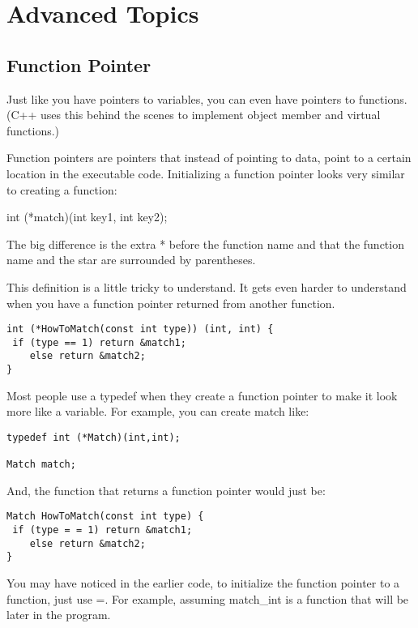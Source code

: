
\chapter{Advanced Topics}

\section{Function Pointer}
Just like you have pointers to variables, you can even have pointers to functions. (C++ uses this behind the scenes to implement object member and virtual functions.)

Function pointers are pointers that instead of pointing to data, point to a certain location in the executable code. Initializing a function pointer looks very similar to creating a function:

int (*match)(int key1, int key2);

The big difference is the extra * before the function name and that the function name and the star are surrounded by parentheses. 

This definition is a little tricky to understand. It gets even harder to understand when you have a function pointer returned from another function.
\begin{verbatim}
int (*HowToMatch(const int type)) (int, int) { 
 if (type == 1) return &match1; 
    else return &match2; 
} 
\end{verbatim}

Most people use a typedef when they create a function pointer to make it look more like a variable. For example, you can create match like:

\begin{verbatim}
typedef int (*Match)(int,int);

Match match;    
\end{verbatim}

 And, the function that returns a function pointer would just be:
 \begin{verbatim}
Match HowToMatch(const int type) { 
 if (type = = 1) return &match1; 
    else return &match2; 
} 
\end{verbatim}

You may have noticed in the earlier code, to initialize the function pointer to a function, just use =. For example, assuming match\_int is a function that will be later in the program.

